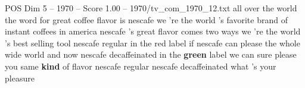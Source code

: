\begin{textsample}{POS Dim 5 – 1970 – Score 1.00 – 1970/tv\_com\_1970\_12.txt}  \label{ex:f5_pos_060}
all over the world the word for great coffee flavor is nescafe we 're the world 's favorite brand of instant coffees in america nescafe 's great flavor comes two ways we 're the world 's best selling tool nescafe regular in the red label if nescafe can please the whole wide world and now nescafe decaffeinated in the \textbf{green} label we can sure please you same \textbf{kind} of flavor nescafe regular nescafe decaffeinated what 's your pleasure

\end{textsample}

